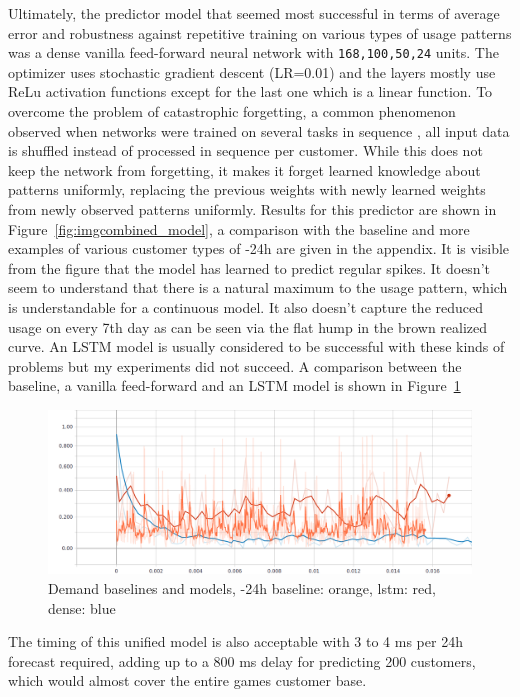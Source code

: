 Ultimately, the predictor model that seemed most successful in terms of average error and robustness against repetitive
training on various types of usage patterns was a dense vanilla feed-forward neural network with
\texttt{168,100,50,24} units. The optimizer uses stochastic gradient descent (LR=0.01) and the layers mostly use
\ac{ReLu} activation functions except for the last one which is a linear function. To overcome the problem of
catastrophic forgetting, a common phenomenon observed when networks were trained on several tasks in sequence
\cite[]{french1999catastrophic}, all input data is shuffled instead of processed in sequence per customer. While this
does not keep the network from forgetting, it makes it forget learned knowledge about patterns uniformly, replacing the
previous weights with newly learned weights from newly observed patterns uniformly. Results for this predictor are shown
in Figure~\ref{fig:imgcombined_model}, a comparison with the baseline and more examples of various customer types of
-24h are given in the appendix. It is visible from the figure that the model has learned to predict regular
spikes. It doesn't seem to understand that there is a natural maximum to the usage pattern, which is understandable for
a continuous model. It also doesn't capture the reduced usage on every 7th day as can be seen via the flat hump
in the brown realized curve. An \ac{LSTM} model is usually considered to be successful with these kinds of problems but
my experiments did not succeed. A comparison between the baseline, a vanilla feed-forward and an \ac{LSTM} model is
shown in Figure~\ref{fig:baseline_dense}

\begin{figure}[b]
    \centering
    \includegraphics[width=1.0\linewidth]{img/demand_baselines_2.png}
    \caption{Demand baselines and models, -24h baseline: orange, lstm: red, dense: blue}
    \label{fig:baseline_dense}
\end{figure}


The timing of this unified model is also acceptable with 3 to 4 ms per 24h forecast required, adding up to a 800 ms
delay for predicting 200 customers, which would almost cover the entire games customer base.

